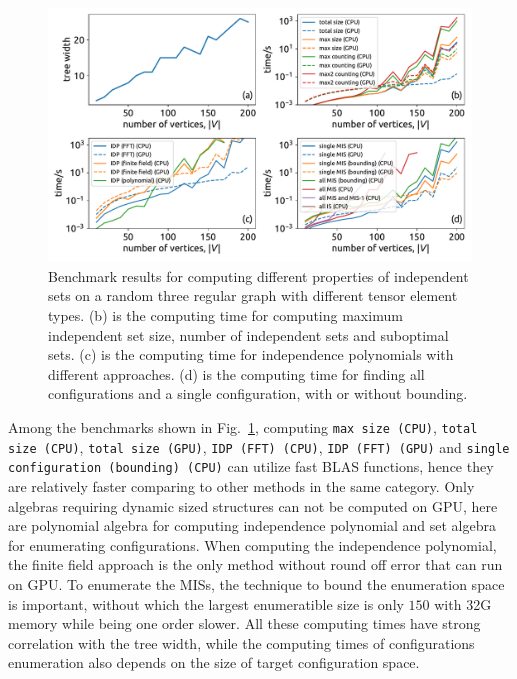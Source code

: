 \documentclass[onefignum, onetabnum]{siamart190516}
\newcommand{\<}{\langle}
\renewcommand{\>}{\rangle}
\newcommand{\Fig}[1]{Fig.~\ref{#1}}
\begin{document}
\begin{figure} 
    \centering
    \includegraphics[width=\textwidth, trim={0cm 0cm 0cm 0cm}, clip]{figures/fig1.pdf}
    \caption{Benchmark results for computing different properties of independent sets on a random three regular graph with different tensor element types.
    (b) is the computing time for computing maximum independent set size, number of independent sets and suboptimal sets.
    (c) is the computing time for independence polynomials with different approaches.
    (d) is the computing time for finding all configurations and a single configuration, with or without bounding.
    }
    \label{fig:benchmark}
\end{figure}

Among the benchmarks shown in \Fig{fig:benchmark}, computing \texttt{max size (CPU)},
\texttt{total size (CPU)}, \texttt{total size (GPU)}, \texttt{IDP (FFT) (CPU)}, \texttt{IDP (FFT) (GPU)} and \texttt{single configuration (bounding) (CPU)} can utilize fast BLAS functions,
hence they are relatively faster comparing to other methods in the same category.
Only algebras requiring dynamic sized structures can not be computed on GPU, here are polynomial algebra for computing independence polynomial and set algebra for enumerating configurations.
When computing the independence polynomial, the finite field approach is the only method without round off error that can run on GPU.
To enumerate the MISs, the technique to bound the enumeration space is important,
without which the largest enumeratible size is only $150$ with 32G memory while being one order slower.
All these computing times have strong correlation with the tree width,
while the computing times of configurations enumeration also depends on the size of target configuration space.
\end{document}
